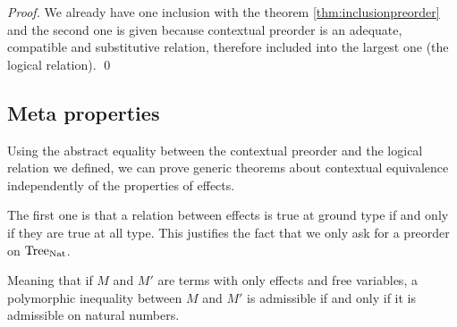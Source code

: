 \begin{theorem}
\end{theorem}

\begin{proof}
    We already have one inclusion with the theorem \ref{thm:inclusionpreorder}
    and the second one is given because 
    contextual preorder is an adequate, compatible and substitutive relation,
    therefore included into the largest one (the logical relation).
\qed\end{proof}

\subsection{Meta properties}

Using the abstract equality between the contextual preorder
and the logical relation we defined, we can prove generic 
theorems about contextual equivalence independently 
of the properties of effects.

The first one is that a relation between effects is true 
at ground type if and only if they are true at all type. This 
justifies the fact that we only ask for a preorder on $\textnormal{Tree}_{\textnormal{Nat}}$.

\begin{theorem}
    Meaning that if $M$ and $M'$ are terms with only effects and free 
    variables, a polymorphic inequality between $M$ and $M'$ is 
    admissible if and only if it is admissible on natural numbers. 
\end{theorem}

